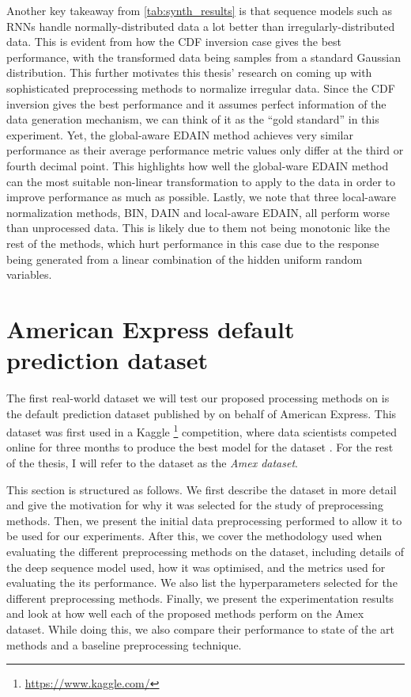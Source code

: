 \documentclass{statsmsc}
\begin{document}
{Another key takeaway from \cref{tab:synth_results} is that sequence
models such as \acp{RNN} handle normally-distributed data a lot better than irregularly-distributed
data. This is evident from how the \ac{CDF} inversion case gives the best performance, with the
transformed data being samples from a standard Gaussian distribution. This further motivates this
thesis' research on coming up with sophisticated preprocessing methods to normalize irregular data.
Since the \ac{CDF} inversion gives the best performance and it assumes perfect information of the
data generation mechanism, we can think of it as the ``gold standard'' in this experiment.
Yet, the global-aware \ac{EDAIN} method achieves very similar performance as their
average performance metric values only differ at the third or fourth decimal point. This highlights
how well the global-ware \ac{EDAIN} method can the most suitable non-linear transformation to
apply to the data in order to improve performance as much as possible.
Lastly, we note that three local-aware normalization methods, \ac{BIN},
\ac{DAIN} and local-aware \ac{EDAIN}, all perform worse than unprocessed data.
This is likely due to them not being monotonic like the rest of the methods,
which hurt performance in this case due to the response being generated from a
linear combination of the hidden uniform random variables.


\section{American Express default prediction dataset}%
\label{sec:amex_data}%

The first real-world dataset we will test our proposed processing methods on is
the default prediction dataset published by \cite{amex-data} on behalf of
American Express.  This dataset was first used in a Kaggle%
\footnote{\url{https://www.kaggle.com/}} competition, where data scientists
competed online for three months to produce the best model for the dataset
\citep{amex-data}.  For the rest of the thesis, I will refer to the dataset as
the \textit{Amex dataset}.

This section is structured as follows. We first describe the
dataset in more detail and give the motivation for why it was selected for the study of
preprocessing methods. Then, we present the initial data preprocessing performed to allow it to
be used for our experiments. After this, we
cover the  methodology used when evaluating the different preprocessing methods on
the dataset, including details of the deep sequence model used, how it was optimised, and
the metrics used for evaluating the its performance.
We also list the hyperparameters selected for the different preprocessing methods.
Finally, we present the experimentation results and look at how well each of the proposed methods
perform on the Amex dataset. While doing this, we also compare their performance to state of
the art methods and a baseline preprocessing technique.

}
\end{document}
